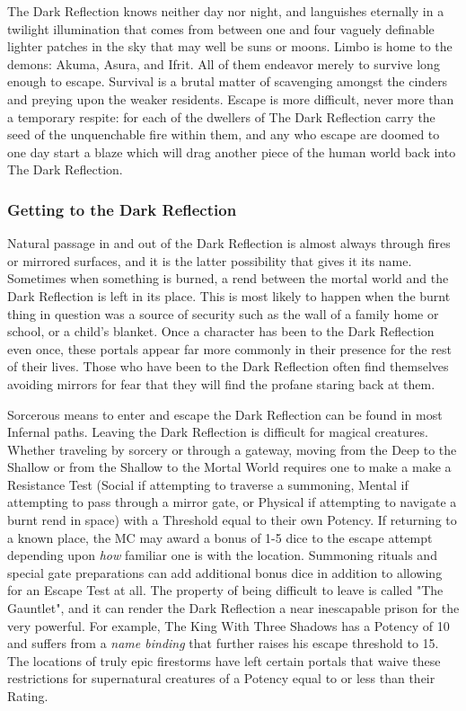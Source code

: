 The Dark Reflection knows neither day nor night, and languishes eternally in a twilight illumination that comes from between one and four vaguely definable lighter patches in the sky that may well be suns or moons. Limbo is home to the demons: Akuma, Asura, and Ifrit. All of them endeavor merely to survive long enough to escape. Survival is a brutal matter of scavenging amongst the cinders and preying upon the weaker residents. Escape is more difficult, never more than a temporary respite: for each of the dwellers of The Dark Reflection carry the seed of the unquenchable fire within them, and any who escape are doomed to one day start a blaze which will drag another piece of the human world back into The Dark Reflection.

\subsubsection{Getting to the Dark Reflection}

Natural passage in and out of the Dark Reflection is almost always through fires or mirrored surfaces, and it is the latter possibility that gives it its name. Sometimes when something is burned, a rend between the mortal world and the Dark Reflection is left in its place. This is most likely to happen when the burnt thing in question was a source of security such as the wall of a family home or school, or a child's blanket. Once a character has been to the Dark Reflection even once, these portals appear far more commonly in their presence for the rest of their lives. Those who have been to the Dark Reflection often find themselves avoiding mirrors for fear that they will find the profane staring back at them.

Sorcerous means to enter and escape the Dark Reflection can be found in most Infernal paths. Leaving the Dark Reflection is difficult for magical creatures. Whether traveling by sorcery or through a gateway, moving from the Deep to the Shallow or from the Shallow to the Mortal World requires one to make a make a Resistance Test (Social if attempting to traverse a summoning, Mental if attempting to pass through a mirror gate, or Physical if attempting to navigate a burnt rend in space) with a Threshold equal to their own Potency. If returning to a known place, the MC may award a bonus of 1-5 dice to the escape attempt depending upon \textit{how} familiar one is with the location. Summoning rituals and special gate preparations can add additional bonus dice in addition to allowing for an Escape Test at all. The property of being difficult to leave is called "The Gauntlet", and it can render the Dark Reflection a near inescapable prison for the very powerful. For example, The King With Three Shadows has a Potency of 10 and suffers from a \textit{name binding} that further raises his escape threshold to 15. The locations of truly epic firestorms have left certain portals that waive these restrictions for supernatural creatures of a Potency equal to or less than their Rating.

